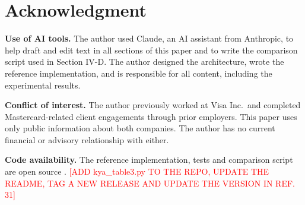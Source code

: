 \documentclass[conference]{IEEEtran}
\newcommand{\todo}[1]{\textcolor{red}{[#1]}}   %
\begin{document}
\section*{Acknowledgment}

\textbf{Use of AI tools.} The author used Claude, an AI assistant from Anthropic, to help draft and edit text in all sections of this paper and to write the comparison script used in Section IV-D. The author designed the architecture, wrote the reference implementation, and is responsible for all content, including the experimental results.

\textbf{Conflict of interest.} The author previously worked at Visa Inc.~and completed Mastercard-related client engagements through prior employers. This paper uses only public information about both companies. The author has no current financial or advisory relationship with either.

\textbf{Code availability.} The reference implementation, tests and comparison script are open source \cite{b31}. \todo{ADD kya\_table3.py TO THE REPO, UPDATE THE README, TAG A NEW RELEASE AND UPDATE THE VERSION IN REF. 31}
\end{document}

